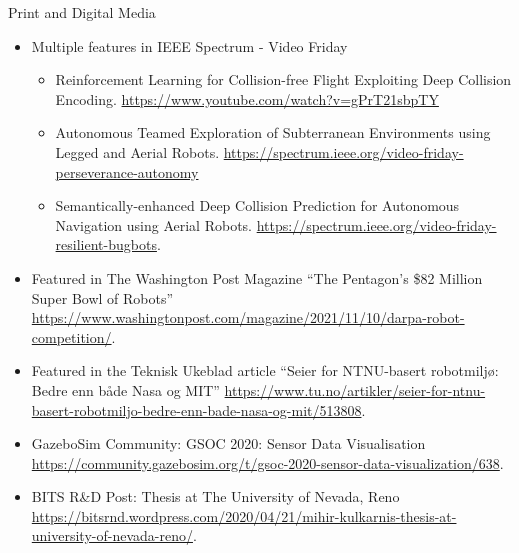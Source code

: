 \documentclass{resume} %
\begin{document}
\begin{rSection} {Print and Digital Media}
\begin{itemize}
    \item Multiple features in IEEE Spectrum - Video Friday
    \begin{itemize}
        \item Reinforcement Learning for Collision-free Flight Exploiting Deep Collision Encoding. \url{https://www.youtube.com/watch?v=gPrT21sbpTY}
        \item{Autonomous Teamed Exploration of Subterranean Environments using Legged and Aerial Robots. \url{https://spectrum.ieee.org/video-friday-perseverance-autonomy}} 
        \item Semantically-enhanced Deep Collision Prediction for Autonomous Navigation using Aerial Robots. \url{https://spectrum.ieee.org/video-friday-resilient-bugbots}.
    \end{itemize}
    
    \item Featured in The Washington Post Magazine ``The Pentagon’s \$82 Million Super Bowl of Robots'' \url{https://www.washingtonpost.com/magazine/2021/11/10/darpa-robot-competition/}.
    \item Featured in the Teknisk Ukeblad article ``Seier for NTNU-basert robotmiljø: Bedre enn både Nasa og MIT'' \url{https://www.tu.no/artikler/seier-for-ntnu-basert-robotmiljo-bedre-enn-bade-nasa-og-mit/513808}.
    \item GazeboSim Community: GSOC 2020: Sensor Data Visualisation \url{https://community.gazebosim.org/t/gsoc-2020-sensor-data-visualization/638}.
    \item BITS R\&D Post: Thesis at The University of Nevada, Reno \url{https://bitsrnd.wordpress.com/2020/04/21/mihir-kulkarnis-thesis-at-university-of-nevada-reno/}.
\end{itemize}
\end{rSection}



\end{document}
